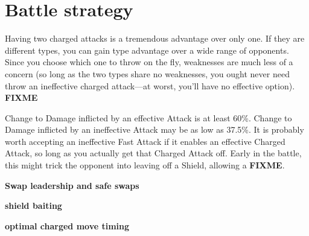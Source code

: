 \chapter{Battle strategy}
\label{chap:strategy}

Having two charged attacks is a tremendous advantage over only one.
If they are different types, you can gain type advantage over a wide
 range of opponents.
Since you choose which one to throw on the fly, weaknesses are
 much less of a concern (so long as the two types share no
 weaknesses, you ought never need throw an ineffective
 charged attack---at worst, you'll have no effective option).
\textbf{FIXME}

Change to Damage inflicted by an effective Attack is at least 60\%.
Change to Damage inflicted by an ineffective Attack may be as
 low as 37.5\%.
It is probably worth accepting an ineffective Fast Attack if it
 enables an effective Charged Attack, so long as you actually
 get that Charged Attack off.
Early in the battle, this might trick the opponent into leaving
 off a Shield, allowing a \textbf{FIXME}.

\textbf{Swap leadership and safe swaps}

\textbf{shield baiting}

\textbf{optimal charged move timing}

